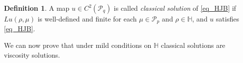 \documentclass{article}
\theoremstyle{definition}
\newtheorem{definition}[theorem]{Definition}
\numberwithin{equation}{section}
\numberwithin{theorem}{section}
\newcommand{\R}{\mathbb{R}}
\newcommand{\dx}{\mathrm{d}x}
\newcommand{\dy}{\mathrm{d}y}
\newcommand{\Hb}{\mathbb{H}}
\newcommand{\eps}{\varepsilon}
\DeclareMathOperator{\supp}{supp}
\def\comment#1{\marginpar{\raggedright\scriptsize{\textcolor{red}{#1}}}}
\newcommand{\Pcal}{{\mathcal P}}
\newcommand{\fdot}{{\,\cdot\,}}
\begin{document}
\begin{definition}
A map
 $u\in  C^2(\Pcal_q)$ is called \emph{classical solution} of \eqref{eq_HJB} if $Lu( \rho,\mu)$ is well-defined and finite for each $\mu\in \Pcal_p$ and $\rho \in \Hb$, and $u$ satisfies \eqref{eq_HJB}.
\end{definition}

We can now prove that under mild conditions on $\Hb$ classical solutions are viscosity solutions.
\end{document}
